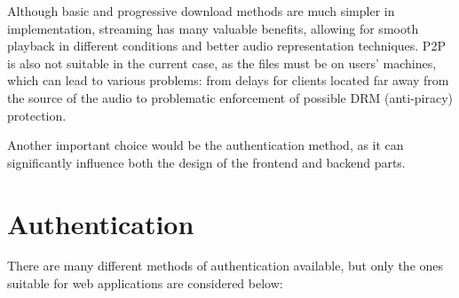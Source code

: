 Although basic and progressive download methods are much simpler in implementation,
streaming has many valuable benefits, allowing for smooth playback in different
conditions and better audio representation techniques. P2P is also not suitable
in the current case, as the files must be on users' machines, which can lead
to various problems: from delays for clients located far away from the source of the audio
to problematic enforcement of possible DRM (anti-piracy) protection.

Another important choice would be the authentication method, as it can significantly influence both
the design of the frontend and backend parts.


\section{Authentication}
There are many different methods of authentication available, but only the ones suitable for
web applications are considered below:
